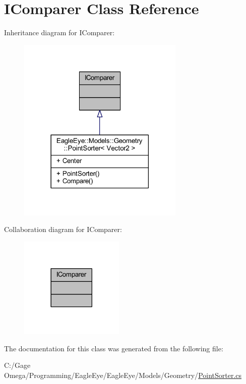 \hypertarget{class_i_comparer}{}\section{I\+Comparer Class Reference}
\label{class_i_comparer}


Inheritance diagram for I\+Comparer\+:
\nopagebreak
\begin{figure}[H]
\begin{center}
\leavevmode
\includegraphics[width=225pt]{class_i_comparer__inherit__graph}
\end{center}
\end{figure}


Collaboration diagram for I\+Comparer\+:
\nopagebreak
\begin{figure}[H]
\begin{center}
\leavevmode
\includegraphics[width=141pt]{class_i_comparer__coll__graph}
\end{center}
\end{figure}


The documentation for this class was generated from the following file\+:\begin{DoxyCompactItemize}
\item 
C\+:/\+Gage Omega/\+Programming/\+Eagle\+Eye/\+Eagle\+Eye/\+Models/\+Geometry/\mbox{\hyperlink{_point_sorter_8cs}{Point\+Sorter.\+cs}}\end{DoxyCompactItemize}
